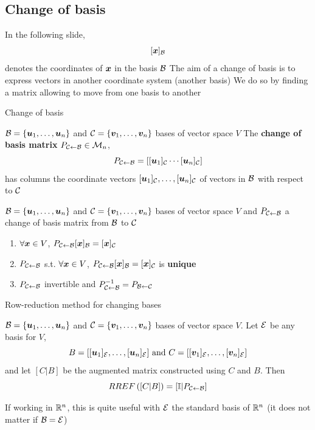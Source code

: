 \documentclass[aspectratio=169]{beamer}\usepackage[]{graphicx}\usepackage[]{xcolor}
\begin{document}
\subsection{Change of basis}
\begin{frame}
	In the following slide, 
	\[
	[\bm{x}]_{\mathcal{B}}
	\]
	denotes the coordinates of $\bm{x}$ in the basis $\mathcal{B}$
	\vfill
	The aim of a change of basis is to express vectors in another coordinate system (another basis)
	\vfill
	We do so by finding a matrix allowing to move from one basis to another
\end{frame}

\begin{frame}{Change of basis}
\begin{definition}
$\mathcal{B}=\{\bm{u}_1,\ldots,\bm{u}_n\}$ and $\mathcal{C}=\{\bm{v}_1,\ldots,\bm{v}_n\}$ bases of vector space $V$
\vfill
The \textbf{change of basis matrix} $P_{\mathcal{C}\leftarrow\mathcal{B}}\in\mathcal{M}_n$,
\[
P_{\mathcal{C}\leftarrow\mathcal{B}}
=\left[
[\bm{u}_1]_{\mathcal{C}} \cdots [\bm{u}_n]_{\mathcal{C}}
\right]
\]
has columns the coordinate vectors $[\bm{u}_1]_{\mathcal{C}},\ldots,[\bm{u}_n]_{\mathcal{C}}$ of vectors in $\mathcal{B}$ with respect to $\mathcal{C}$
\end{definition}
\vfill
\begin{theorem}
$\mathcal{B}=\{\bm{u}_1,\ldots,\bm{u}_n\}$ and $\mathcal{C}=\{\bm{v}_1,\ldots,\bm{v}_n\}$ bases of vector space $V$ and $P_{\mathcal{C}\leftarrow\mathcal{B}}$ a change of basis matrix from $\mathcal{B}$ to $\mathcal{C}$
\begin{enumerate}
\item $\forall\bm{x}\in V$, $P_{\mathcal{C}\leftarrow\mathcal{B}}[\bm{x}]_{\mathcal{B}} = [\bm{x}]_{\mathcal{C}}$
\item $P_{\mathcal{C}\leftarrow\mathcal{B}}$ s.t. $\forall\bm{x}\in V$, $P_{\mathcal{C}\leftarrow\mathcal{B}}[\bm{x}]_{\mathcal{B}} = [\bm{x}]_{\mathcal{C}}$ is \textbf{unique}
\item $P_{\mathcal{C}\leftarrow\mathcal{B}}$ invertible and $P_{\mathcal{C}\leftarrow\mathcal{B}}^{-1}=P_{\mathcal{B}\leftarrow\mathcal{C}}$
\end{enumerate}
\end{theorem}
\end{frame}


\begin{frame}{Row-reduction method for changing bases}
\begin{theorem}
\label{th:change-basis-construction}
$\mathcal{B}=\{\bm{u}_1,\ldots,\bm{u}_n\}$ and $\mathcal{C}=\{\bm{v}_1,\ldots,\bm{v}_n\}$ bases of vector space $V$. Let $\mathcal{E}$ be any basis for $V$,
\[
B = [[\bm{u}_1]_{\mathcal{E}},\ldots,[\bm{u}_n]_{\mathcal{E}}] 
\textrm{ and }
C = [[\bm{v}_1]_{\mathcal{E}},\ldots,[\bm{v}_n]_{\mathcal{E}}] 
\]
and let $[C|B]$ be the augmented matrix constructed using $C$ and $B$. Then
\[
RREF\left([C|B]\right)
=[\mathbb{I}|P_{\mathcal{C}\leftarrow\mathcal{B}}]
\]
\end{theorem}
\vfill
If working in $\mathbb{R}^n$, this is quite useful with $\mathcal{E}$ the standard basis of $\mathbb{R}^n$ (it does not matter if $\mathcal{B}=\mathcal{E}$)
\end{frame}
\end{document}
